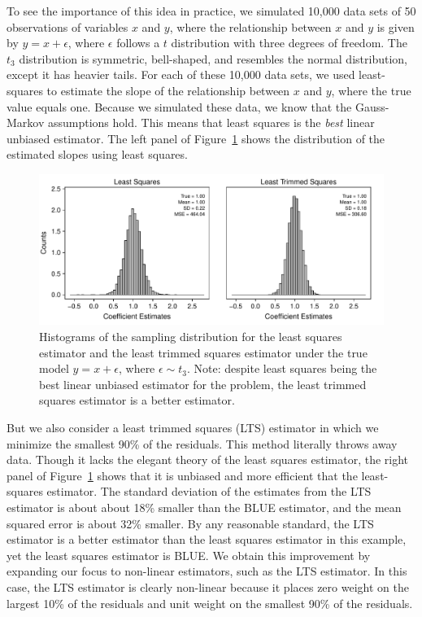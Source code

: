 \documentclass[12pt]{article}
\begin{document}
To see the importance of this idea in practice, we simulated 10,000 data sets of 50 observations of variables $x$ and $y$, where the relationship between $x$ and $y$ is given by $y = x + \epsilon$, where $\epsilon$ follows a $t$ distribution with three degrees of freedom. 
The $t_3$ distribution is symmetric, bell-shaped, and resembles the normal distribution, except it has heavier tails. 
For each of these 10,000 data sets, we used least-squares to estimate the slope of the relationship between $x$ and $y$, where the true value equals one. 
Because we simulated these data, we know that the Gauss-Markov assumptions hold. 
This means that least squares is the \textit{best} linear unbiased estimator. 
The left panel of Figure~\ref{fig:lts-illustration} shows the distribution of the estimated slopes using least squares.

\begin{figure}[h!]
\begin{center}
\includegraphics[scale = .7]{figs/lts-illustration.pdf}
\caption{Histograms of the sampling distribution for the least squares estimator and the least trimmed squares estimator under the true model $y = x + \epsilon$, where $\epsilon \sim t_3$. 
Note: despite least squares being the best linear unbiased estimator for the problem, the least trimmed squares estimator is a better estimator.}\label{fig:lts-illustration}
\end{center}
\end{figure}

But we also consider a least trimmed squares (LTS) estimator in which we minimize the smallest 90\% of the residuals. 
This method literally throws away data. 
Though it lacks the elegant theory of the least squares estimator, the right panel of Figure~\ref{fig:lts-illustration} shows that it is unbiased and more efficient that the least-squares estimator. 
The standard deviation of the estimates from the LTS estimator is about about 18\% smaller than the BLUE estimator, and the mean squared error is about 32\% smaller. 
By any reasonable standard, the LTS estimator is a better estimator than the least squares estimator in this example, yet the least squares estimator is BLUE\@. 
We obtain this improvement by expanding our focus to non-linear estimators, such as the LTS estimator. 
In this case, the LTS estimator is clearly non-linear because it places zero weight on the largest 10\% of the residuals and unit weight on the smallest 90\% of the residuals.
\end{document}

